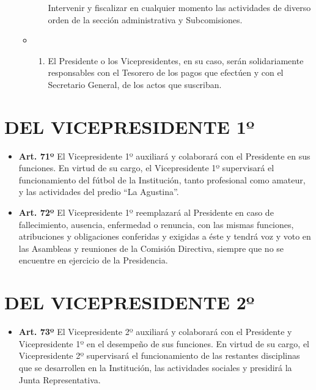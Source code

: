 \documentclass[openany]{book}
\providecommand{\tightlist}{%
  \setlength{\itemsep}{0pt}\setlength{\parskip}{0pt}}
\begin{document}
\begin{itemize}
\begin{itemize}
\begin{enumerate}
      Intervenir y fiscalizar en cualquier momento las actividades de diverso orden de la sección administrativa y Subcomisiones.
    \end{enumerate}
  \item
    \begin{enumerate}
    \def\labelenumi{\alph{enumi})}
    \setcounter{enumi}{12}
    \tightlist
    \item
      El Presidente o los Vicepresidentes, en su caso, serán solidariamente responsables con el Tesorero de los pagos que efectúen y con el Secretario General, de los actos que suscriban.
    \end{enumerate}
  \end{itemize}
\end{itemize}

\hypertarget{cap9}{%
\chapter{DEL VICEPRESIDENTE 1º}\label{cap9}}

\begin{itemize}
\tightlist
\item
  \textbf{Art. 71º}
  El Vicepresidente 1º auxiliará y colaborará con el Presidente en sus funciones. En virtud de su cargo, el Vicepresidente 1º supervisará el funcionamiento del fútbol de la Institución, tanto profesional como amateur, y las actividades del predio ``La Agustina''.
\end{itemize}

\begin{itemize}
\tightlist
\item
  \textbf{Art. 72º}
  El Vicepresidente 1º reemplazará al Presidente en caso de fallecimiento, ausencia, enfermedad o renuncia, con las mismas funciones, atribuciones y obligaciones conferidas y exigidas a éste y tendrá voz y voto en las Asambleas y reuniones de la Comisión Directiva, siempre que no se encuentre en ejercicio de la Presidencia.
\end{itemize}

\hypertarget{cap10}{%
\chapter{DEL VICEPRESIDENTE 2º}\label{cap10}}

\begin{itemize}
\tightlist
\item
  \textbf{Art. 73º}
  El Vicepresidente 2º auxiliará y colaborará con el Presidente y Vicepresidente 1º en el desempeño de sus funciones. En virtud de su cargo, el Vicepresidente 2º supervisará el funcionamiento de las restantes disciplinas que se desarrollen en la Institución, las actividades sociales y presidirá la Junta Representativa.
\end{itemize}
\end{document}
